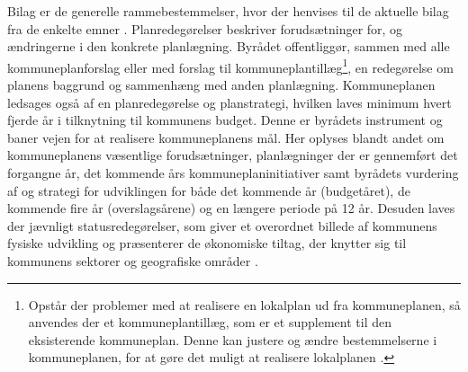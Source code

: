 \newline \indent{     }  Bilag er de generelle rammebestemmelser, hvor der henvises til de aktuelle bilag fra de enkelte emner \citep{bilag}.
\newline \indent{     }  Planredegørelser beskriver forudsætninger for, og ændringerne i den konkrete planlægning. Byrådet offentliggør, sammen med alle kommuneplanforslag eller med forslag til kommuneplantillæg\footnote{Opstår der problemer med at realisere en lokalplan ud fra kommuneplanen, så anvendes der et kommuneplantillæg, som er et supplement til den eksisterende kommuneplan. Denne kan justere og ændre bestemmelserne i kommuneplanen, for at gøre det muligt at realisere lokalplanen \citep{kommuneplan2009}.}, en redegørelse om planens baggrund og sammenhæng med anden planlægning. Kommuneplanen ledsages også af en planredegørelse og planstrategi, hvilken laves minimum hvert fjerde år i tilknytning til kommunens budget. Denne er byrådets instrument og baner vejen for at realisere kommuneplanens mål. Her oplyses blandt andet om kommuneplanens væsentlige forudsætninger, planlægninger der er gennemført det forgangne år, det kommende års kommuneplaninitiativer samt byrådets vurdering af og strategi for udviklingen for både det kommende år (budgetåret), de kommende fire år (overslagsårene) og en længere periode på 12 år. Desuden laves der jævnligt statusredegørelser, som giver et overordnet billede af kommunens fysiske udvikling og præsenterer de økonomiske tiltag, der knytter sig til kommunens sektorer og geografiske områder \citep{planredegorelse}.


